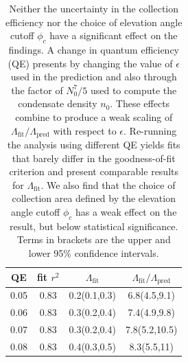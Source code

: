 	\begin{table}

  \begin{minipage}[t]{0.45\textwidth}
  		\vspace{0pt}
		\caption{Neither the uncertainty in the collection efficiency nor the choice of elevation angle cutoff $\phi_c$ have a significant effect on the findings. A change in quantum efficiency (QE) presents by changing the value of $\epsilon$ used in the prediction and also through the factor of $N_{0}^7/5$ used to compute the condensate density $n_0$. These effects combine to produce a weak scaling of $\Lambda_\textrm{fit}/\Lambda_\textrm{pred}$ with respect to $\epsilon$.  Re-running the analysis using different QE yields fits that barely differ in the goodness-of-fit criterion and present comparable results for $\Lambda_\textrm{fit}$. We also find that the choice of collection area defined by the elevation angle cutoff $\phi_c$ has a weak effect on the result, but below statistical significance. Terms in brackets are the upper and lower 95\% confidence intervals.}
		\label{tab:choice_indep}
  \end{minipage}\hfill
  	  \begin{minipage}[t]{0.5\textwidth}
	  \vspace{0pt}
		\begin{tabular}{c c c c}
			\hline\hline
			QE & fit $r^2$ &  $\Lambda_\textrm{fit}$ & $\Lambda_\textrm{fit}/\Lambda_\textrm{pred}$\\      
			\hline
			0.05    &   0.83   &   0.2(0.1,0.3)  &  6.8(4.5,9.1)\\
			0.06    &   0.83   &   0.3(0.2,0.4)  &  7.4(4.9,9.8)\\
			0.07    &   0.83   &   0.3(0.2,0.4)  &  7.8(5.2,10.5)\\
			0.08    &   0.83   &   0.4(0.3,0.5)  &  8.3(5.5,11)\\

\end{tabular}
\end{minipage}
\end{table}
